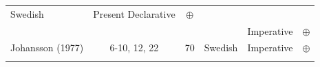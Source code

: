 \documentclass[oneside]{report}
\theoremstyle{definition}
\theoremstyle{definition}
\theoremstyle{definition}
\theoremstyle{remark}
\begin{document}
\begin{longtable}[]{@{}lcclcc@{}}
\begin{minipage}[t]{0.06\columnwidth}
Swedish\strut
\end{minipage} & \begin{minipage}[t]{0.31\columnwidth}\centering\strut
Present Declarative\strut
\end{minipage} & \begin{minipage}[t]{0.12\columnwidth}\centering\strut
\(\oplus\)\strut
\end{minipage}\tabularnewline
\begin{minipage}[t]{0.17\columnwidth}\raggedright\strut
\strut
\end{minipage} & \begin{minipage}[t]{0.09\columnwidth}\centering\strut
\strut
\end{minipage} & \begin{minipage}[t]{0.09\columnwidth}\centering\strut
\strut
\end{minipage} & \begin{minipage}[t]{0.06\columnwidth}\raggedright\strut
\strut
\end{minipage} & \begin{minipage}[t]{0.31\columnwidth}\centering\strut
Imperative\strut
\end{minipage} & \begin{minipage}[t]{0.12\columnwidth}\centering\strut
\(\oplus\)\strut
\end{minipage}\tabularnewline
\begin{minipage}[t]{0.17\columnwidth}\raggedright\strut
Johansson (1977)\strut
\end{minipage} & \begin{minipage}[t]{0.09\columnwidth}\centering\strut
6-10, 12, 22\strut
\end{minipage} & \begin{minipage}[t]{0.09\columnwidth}\centering\strut
70\strut
\end{minipage} & \begin{minipage}[t]{0.06\columnwidth}\raggedright\strut
Swedish\strut
\end{minipage} & \begin{minipage}[t]{0.31\columnwidth}\centering\strut
Imperative\strut
\end{minipage} & \begin{minipage}[t]{0.12\columnwidth}\centering\strut
\(\oplus\)\strut
\end{minipage}\tabularnewline
\begin{minipage}[t]{0.17\columnwidth}\raggedright\strut
\strut
\end{minipage} & \begin{minipage}[t]{0.09\columnwidth}\centering\strut

\end{minipage}
\end{longtable}
\end{document}
